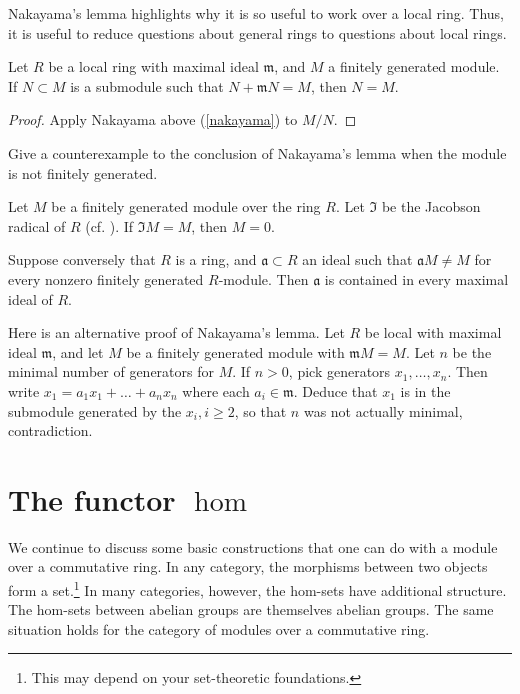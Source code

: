 Nakayama's lemma highlights why it is so useful to work over a local ring.
Thus, it is useful to reduce questions about general rings to questions about
local rings.

\begin{corollary} 
Let $R$ be a local ring with maximal ideal $\mathfrak{m}$, and $M$ a finitely
generated module. If $N \subset M$ is a submodule such that $N + \mathfrak{m}N =
M$, then $N=M$.
\end{corollary} 
\begin{proof} 
Apply Nakayama above (\cref{nakayama}) to $M/N$.
\end{proof} 

\begin{exercise}
Give a counterexample to the conclusion of Nakayama's lemma when the module is
not finitely generated.
\end{exercise}
\begin{exercise}
Let $M$ be a finitely generated module over the ring $R$. Let $\mathfrak{I}$
be the Jacobson
radical of $R$ (cf. ). If $\mathfrak{I} M = M$,
then $M =
0$.
\end{exercise}
\begin{exercise} 
Suppose conversely that $R$ is a ring, and $\mathfrak{a} \subset R$ an ideal
such that $\mathfrak{a} M \neq M$ for every nonzero finitely generated
$R$-module. Then $\mathfrak{a}$ is contained in every maximal ideal of $R$.
\end{exercise} 


\begin{exercise}
Here is an alternative proof of Nakayama's lemma. Let $R$ be local with
maximal ideal $\mathfrak{m}$, and let $M$ be a finitely generated module with
$\mathfrak{m}M = M$. Let $n$ be the minimal number of generators for $M$. If
$n>0$, pick generators $x_1, \dots, x_n$. Then write $x_1 = a_1 x_1 + \dots +
a_n x_n$ where each $a_i \in \mathfrak{m}$. Deduce that $x_1$ is in the
submodule generated by the $x_i, i \geq 2$, so that $n$ was not actually
minimal, contradiction.
\end{exercise}

\section{The functor $\hom$}
We continue to  discuss some basic constructions that one can do with a
module over a
commutative ring. In any category, the morphisms between two objects form a
set.\footnote{This may depend on your set-theoretic foundations.} In many
categories, however, the hom-sets have additional structure. The hom-sets
between abelian groups are themselves abelian groups. The same situation holds
for the category of modules over a commutative ring.


